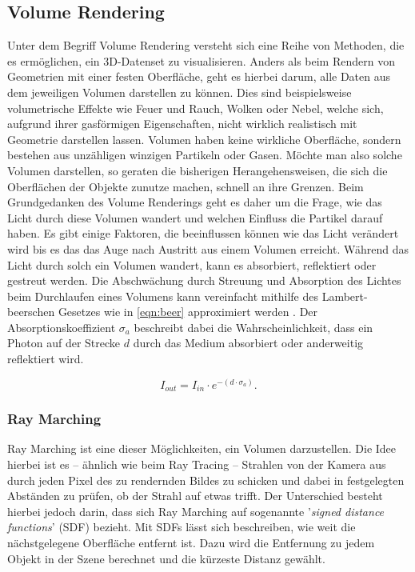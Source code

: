 \newpage
\subsection{Volume Rendering}

Unter dem Begriff Volume Rendering versteht sich eine Reihe von Methoden, die es ermöglichen, ein 3D-Datenset zu visualisieren.
Anders als beim Rendern von Geometrien mit einer festen Oberfläche, geht es hierbei darum, alle Daten aus
dem jeweiligen Volumen darstellen zu können. Dies sind beispielsweise volumetrische Effekte wie Feuer und Rauch, Wolken oder Nebel,
welche sich, aufgrund ihrer gasförmigen Eigenschaften, nicht wirklich realistisch mit Geometrie darstellen lassen.
Volumen haben keine wirkliche Oberfläche, sondern bestehen aus unzähligen winzigen Partikeln oder Gasen.
Möchte man also solche Volumen darstellen, so geraten die bisherigen Herangehensweisen, die sich die Oberflächen der Objekte zunutze machen,
schnell an ihre Grenzen. Beim Grundgedanken des Volume Renderings geht es daher um die Frage, wie das Licht durch diese Volumen
wandert und welchen Einfluss die Partikel darauf haben.
Es gibt einige Faktoren, die beeinflussen können wie das Licht verändert wird bis es das das Auge nach Austritt aus einem Volumen erreicht.
Während das Licht durch solch ein Volumen wandert, kann es absorbiert, reflektiert oder gestreut werden.
Die Abschwächung durch Streuung und Absorption des Lichtes beim Durchlaufen eines Volumens kann vereinfacht mithilfe des Lambert-beerschen Gesetzes wie in \autoref{eqn:beer}
approximiert werden \parencite{Mayerhofer2020}.
Der Absorptionskoeffizient $\sigma_a$ beschreibt dabei die Wahrscheinlichkeit, dass ein Photon auf der Strecke $d$ durch das Medium absorbiert oder anderweitig
reflektiert wird.

\vspace{-0.5cm  }
\begin{equation}
	\label{eqn:beer}
	I_{out} = I_{in} \cdot e^{- ( d \cdot\sigma_a  )}.
\end{equation}





\subsubsection{Ray Marching}

Ray Marching ist eine dieser Möglichkeiten, ein Volumen darzustellen. Die Idee hierbei ist es – ähnlich wie beim Ray Tracing –
Strahlen von der Kamera aus durch jeden Pixel des zu rendernden Bildes zu schicken und dabei in festgelegten Abständen zu prüfen,
ob der Strahl auf etwas trifft.
Der Unterschied besteht hierbei jedoch darin, dass sich Ray Marching auf sogenannte '\textit{signed distance functions}' (SDF) bezieht.
Mit SDFs lässt sich beschreiben, wie weit die nächstgelegene Oberfläche entfernt ist. Dazu wird die Entfernung zu jedem Objekt
in der Szene berechnet und die kürzeste Distanz gewählt.

